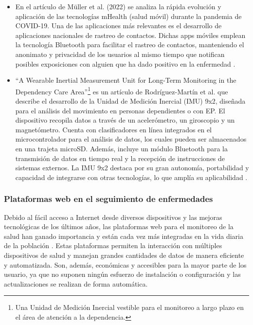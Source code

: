 \begin{itemize}
    \item En el artículo de Müller et al. (2022) se analiza la rápida evolución y aplicación de las tecnologías mHealth (salud móvil) durante la pandemia de COVID-19. Una de las aplicaciones más relevantes es el desarrollo de aplicaciones nacionales de rastreo de contactos. Dichas apps móviles emplean la tecnología Bluetooth para facilitar el rastreo de contactos, manteniendo el anonimato y privacidad de los usuarios al mismo tiempo que notifican posibles exposiciones con alguien que ha dado positivo en la enfermedad \cite{COVID:doi/10.2196/26041}.
    
    \item ``A Wearable Inertial Measurement Unit for Long-Term Monitoring in the Dependency Care Area''\footnote{Una Unidad de Medición Inercial vestible para el monitoreo a largo plazo en el área de atención a la dependencia.} es un artículo de Rodríguez-Martín et al. que describe el desarrollo de la Unidad de Medición Inercial (IMU) 9x2, diseñada para el análisis del movimiento en personas dependientes o con EP. El dispositivo recopila datos a través de un acelerómetro, un giroscopio y un magnetómetro. Cuenta con clasificadores en línea integrados en el microcontrolador para el análisis de datos, los cuales pueden ser almacenados en una trajeta microSD. Además, incluye un módulo Bluetooth para la transmisión de datos en tiempo real y la recepción de instrucciones de sistemas externos. La IMU 9x2 destaca por su gran autonomía, portabilidad y capacidad de integrarse con otras tecnologías, lo que amplía su aplicabilidad \cite{IMU}.
\end{itemize}

\subsubsection{Plataformas web en el seguimiento de enfermedades}
Debido al fácil acceso a Internet desde diversos dispositivos y las mejoras tecnológicas de los últimos años, las plataformas web para el monitoreo de la salud han ganado importancia y están cada vez más integradas en la vida diaria de la población \cite{field2002telemedicine}. Estas plataformas permiten la interacción con múltiples dispositivos de salud y manejan grandes cantidades de datos de manera eficiente y automatizada. Son, además, económicas y accesibles para la mayor parte de los usuario, ya que no suponen ningún esfuerzo de instalación o configuración y las actualizaciones se realizan de forma automática.


